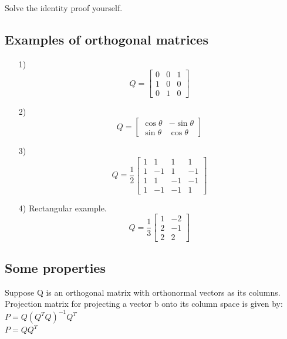 \documentclass[]{article}
\begin{document}
	\noindent
	Solve the identity proof yourself.
	
\vspace{10pt}

\subsection{Examples of orthogonal matrices}
\vspace{10pt}
\begin{itemize}
	\item[1)] \[
	Q=\begin{bmatrix}
		0&0&1\\
		1&0&0\\
		0&1&0
	\end{bmatrix}
	\]
	\item[2)]\[
	Q=\begin{bmatrix}
		\cos{\theta} & -\sin{\theta}\\
		\sin{\theta} & \cos{\theta}
	\end{bmatrix}
	\]
	\item[3)]\[
	Q=\frac{1}{2}\begin{bmatrix}
		1&1&1&1\\
		1&-1&1&-1\\
		1&1&-1&-1\\
		1&-1&-1&1
	\end{bmatrix}
	\]
	\item[4)]Rectangular example.\[
	 Q=\frac{1}{3}\begin{bmatrix}
	 	1&-2\\
	 	2&-1\\
	 	2&2
	 \end{bmatrix}
	\]
\end{itemize}

\vspace{10pt}

\subsection{Some properties}
\vspace{10pt}

Suppose Q is an orthogonal matrix with orthonormal vectors as its columns. Projection matrix for projecting a vector b onto its column space is given by:\\

\noindent
$P=Q{(Q^TQ)}^{-1}Q^T$\\

\noindent
$P=QQ^T$\\
\end{document}
